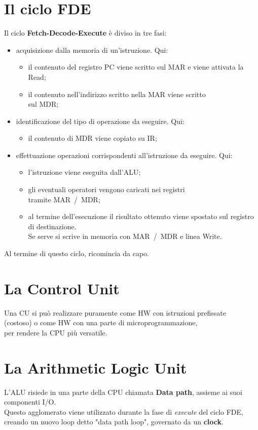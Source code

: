 \documentclass[12pt]{article}
\begin{document}
\section{Il ciclo FDE}
Il ciclo \textbf{Fetch-Decode-Execute} è diviso in tre fasi:
\begin{itemize}
    \item acquisizione dalla memoria di un'istruzione. Qui:
    \begin{itemize}
        \item il contenuto del registro PC viene scritto sul MAR e viene attivata la Read;
        \item il contenuto nell'indirizzo scritto nella MAR viene scritto\\
            sul MDR;
    \end{itemize}
    \item identificazione del tipo di operazione da eseguire. Qui:
    \begin{itemize}
        \item il contenuto di MDR viene copiato su IR;
    \end{itemize}
    \item effettuazione operazioni corrispondenti all'istruzione da eseguire. Qui:
    \begin{itemize}
        \item l'istruzione viene eseguita dall'ALU;
        \item gli eventuali operatori vengono caricati nei registri\\
            tramite MAR~/~MDR;
        \item al termine dell'esecuzione il risultato ottenuto viene spostato sul registro di destinazione.\\
            Se serve si scrive in memoria con MAR~/~MDR e linea Write.
    \end{itemize}
\end{itemize}
Al termine di questo ciclo, ricomincia da capo.
\section{La Control Unit}
Una CU si può realizzare puramente come HW con istruzioni prefissate\\
(costoso) o come HW con una parte di microprogrammazione,\\
per rendere la CPU più versatile.
\section{La Arithmetic Logic Unit}
L'ALU risiede in una parte della CPU chiamata \textbf{Data path}, assieme ai suoi componenti I/O.\\
Questo agglomerato viene utilizzato durante la fase di \textit{execute} del ciclo FDE, creando un nuovo loop detto "data path loop", governato da un \textbf{clock}.
\end{document}
